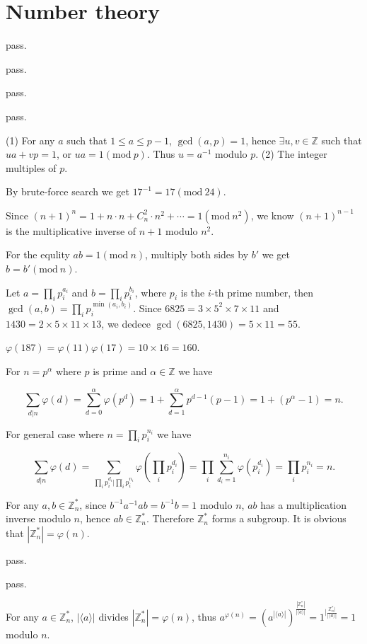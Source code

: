\chapter{Number theory}

\ex pass.

\ex pass.

\ex pass.

\ex pass.

\ex (1) For any $a$ such that $1\le a\le p-1$, $\gcd(a,p)=1$, hence $\exists u,v\in\mathbb{Z}$ such that $ua+vp=1$, or $ua=1(\mathrm{mod}~p)$.
Thus $u=a^{-1}$ modulo $p$.
(2) The integer multiples of $p$.

\ex By brute-force search we get $17^{-1}=17(\mathrm{mod}~24)$.

\ex Since $(n+1)^n=1+n\cdot n+C_n^2\cdot n^2+\cdots=1(\mathrm{mod}~n^2)$, we know $(n+1)^{n-1}$ is the multiplicative inverse of $n+1$ modulo $n^2$.

\ex For the equlity $ab=1(\mathrm{mod}~n)$, multiply both sides by $b'$ we get $b=b'(\mathrm{mod}~n)$.

\ex Let $a=\prod_ip_i^{a_i}$ and $b=\prod_ip_i^{b_i}$, where $p_i$ is the $i$-th prime number, then $\gcd(a,b)=\prod_ip_i^{\min(a_i,b_i)}$.
Since $6825=3\times5^2\times7\times11$ and $1430=2\times5\times11\times13$, we dedece $\gcd(6825,1430)=5\times11=55$.

\ex $\varphi(187)=\varphi(11)\varphi(17)=10\times16=160$.

\ex For $n=p^\alpha$ where $p$ is prime and $\alpha\in\mathbb{Z}$ we have

$$\sum_{d|n}\varphi(d) = \sum_{d=0}^{\alpha}\varphi(p^d) = 1 + \sum_{d=1}^{\alpha}p^{d-1}(p-1) = 1 + (p^\alpha - 1) = n.$$

For general case where $n=\prod_ip_i^{n_i}$ we have

$$\sum_{d|n}\varphi(d) = \sum_{\prod_ip_i^{d_i}|\prod_ip_i^{n_i}}\varphi\left(\prod_ip_i^{d_i}\right) = \prod_i\sum_{d_i=1}^{n_i}\varphi(p_i^{d_i}) = \prod_i p_i^{n_i} = n.$$

\ex For any $a,b\in\mathbb{Z}_n^*$, since $b^{-1}a^{-1}ab=b^{-1}b=1$ modulo $n$, $ab$ has a multiplication inverse modulo $n$, hence $ab\in\mathbb{Z}_n^*$.
Therefore $\mathbb{Z}_n^*$ forms a subgroup.
It is obvious that $|\mathbb{Z}_n^*|=\varphi(n)$.

\ex pass.

\ex pass.

\ex For any $a\in\mathbb{Z}_n^*$, $|\langle a\rangle|$ divides $|\mathbb{Z}_n^*|=\varphi(n)$, thus $a^{\varphi(n)} = \left(a^{|\langle a\rangle|}\right)^{\frac{|\mathbb{Z}_n^*|}{|\langle a\rangle|}} = 1^{|\frac{\mathbb{Z}_n^*|}{|\langle a\rangle|}} = 1$ modulo $n$.

